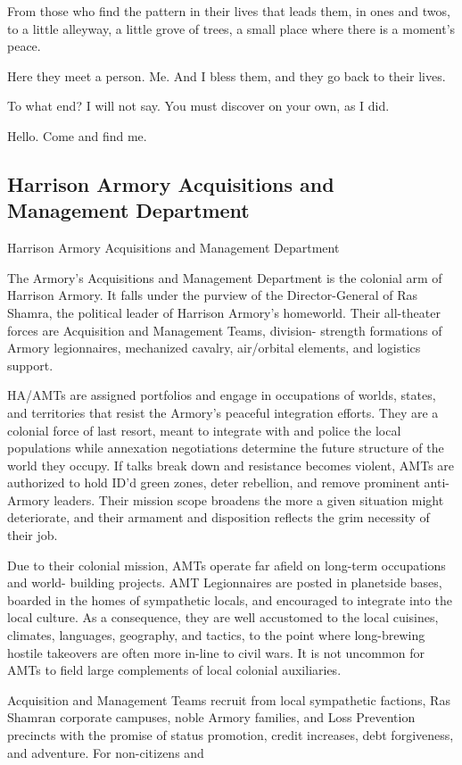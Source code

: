 From those who find the pattern in their lives that leads them, in ones and twos, to a little  
alleyway, a little grove of trees, a small place where there is a moment’s peace.   

Here they meet a person. Me. And I bless them, and they go back to their lives.   

To what end? I will not say. You must discover on your own, as I did.    

Hello. Come and find me.    
\subsection{Harrison Armory Acquisitions and Management Department}
Harrison Armory Acquisitions and Management Department  

The Armory’s Acquisitions and Management Department is the colonial arm of Harrison Armory.  
It falls under the purview of the Director-General of Ras Shamra, the political leader of Harrison  
Armory’s homeworld. Their all-theater forces are Acquisition and Management Teams, division- 
strength formations of Armory legionnaires, mechanized cavalry, air/orbital elements, and  
logistics support.
 

HA/AMTs are assigned portfolios and engage in occupations of worlds, states, and territories  
that resist the Armory’s peaceful integration efforts. They are a colonial force of last resort, meant  
to integrate with and police the local populations while annexation negotiations determine the  
future structure of the world they occupy. If talks break down and resistance becomes violent,  
AMTs are authorized to hold ID’d green zones, deter rebellion, and remove prominent anti- 
Armory leaders. Their mission scope broadens the more a given situation might deteriorate, and  
their armament and disposition reflects the grim necessity of their job.  
 

Due to their colonial mission, AMTs operate far afield on long-term occupations and world- 
building projects. AMT Legionnaires are posted in planetside bases, boarded in the homes of  
sympathetic locals, and encouraged to integrate into the local culture. As a consequence, they  
are well accustomed to the local cuisines, climates, languages, geography, and tactics, to the  
point where long-brewing hostile takeovers are often more in-line to civil wars. It is not  
uncommon for AMTs to field large complements of local colonial auxiliaries.
 

Acquisition and Management Teams recruit from local sympathetic factions, Ras Shamran  
corporate campuses, noble Armory families, and Loss Prevention precincts with the promise of  
status promotion, credit increases, debt forgiveness, and adventure. For non-citizens and  

